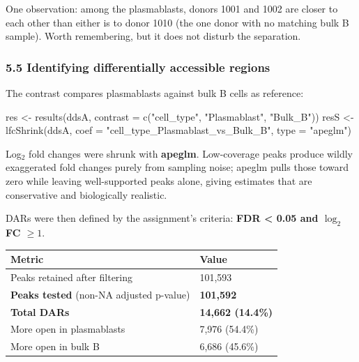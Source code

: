 \documentclass[
  11pt,
  a4paper,
]{article}
\newenvironment{Shaded}{}{}
\newcommand{\AttributeTok}[1]{\textcolor[rgb]{0.49,0.56,0.16}{#1}}
\newcommand{\FunctionTok}[1]{\textcolor[rgb]{0.02,0.16,0.49}{#1}}
\newcommand{\NormalTok}[1]{#1}
\newcommand{\OtherTok}[1]{\textcolor[rgb]{0.00,0.44,0.13}{#1}}
\newcommand{\StringTok}[1]{\textcolor[rgb]{0.25,0.44,0.63}{#1}}
\begin{document}
One observation: among the plasmablasts, donors 1001 and 1002 are closer
to each other than either is to donor 1010 (the one donor with no
matching bulk B sample). Worth remembering, but it does not disturb the
separation.

\hypertarget{identifying-differentially-accessible-regions}{%
\subsubsection{5.5 Identifying differentially accessible
regions}\label{identifying-differentially-accessible-regions}}

The contrast compares plasmablasts against bulk B cells as reference:

\begin{Shaded}
\begin{Highlighting}[]
\NormalTok{res  }\OtherTok{\textless{}{-}} \FunctionTok{results}\NormalTok{(ddsA, }\AttributeTok{contrast =} \FunctionTok{c}\NormalTok{(}\StringTok{"cell\_type"}\NormalTok{, }\StringTok{"Plasmablast"}\NormalTok{, }\StringTok{"Bulk\_B"}\NormalTok{))}
\NormalTok{resS }\OtherTok{\textless{}{-}} \FunctionTok{lfcShrink}\NormalTok{(ddsA, }\AttributeTok{coef =} \StringTok{"cell\_type\_Plasmablast\_vs\_Bulk\_B"}\NormalTok{, }\AttributeTok{type =} \StringTok{"apeglm"}\NormalTok{)}
\end{Highlighting}
\end{Shaded}

Log\(_{2}\) fold changes were shrunk with \textbf{apeglm}. Low-coverage
peaks produce wildly exaggerated fold changes purely from sampling
noise; apeglm pulls those toward zero while leaving well-supported peaks
alone, giving estimates that are conservative and biologically
realistic.

DARs were then defined by the assignment's criteria: \textbf{FDR
\textless{} 0.05 and \textbar{}\(\log_2\)FC\textbar{} \(\geq 1\)}.

\begin{longtable}[]{@{}ll@{}}
\toprule\noalign{}
Metric & Value \\
\midrule\noalign{}
\endhead
\bottomrule\noalign{}
\endlastfoot
Peaks retained after filtering & 101,593 \\
\textbf{Peaks tested} (non-NA adjusted p-value) & \textbf{101,592} \\
\textbf{Total DARs} & \textbf{14,662 (14.4\%)} \\
More open in plasmablasts & 7,976 (54.4\%) \\
More open in bulk B & 6,686 (45.6\%) \\
\end{longtable}
\end{document}
